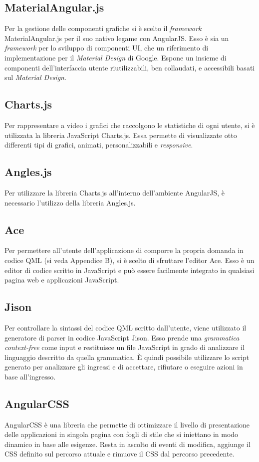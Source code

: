 \subsection{MaterialAngular.js}
Per la gestione delle componenti grafiche si è scelto il \textit{framework} MaterialAngular.js per il suo nativo legame con AngularJS. Esso è sia un \textit{framework} per lo sviluppo di componenti UI, che un riferimento di implementazione per il \textit{Material Design} di Google. Espone un insieme di componenti dell'interfaccia utente riutilizzabili, ben collaudati, e accessibili basati sul \textit{Material Design}.
\subsection{Charts.js}
Per rappresentare a video i grafici che raccolgono le statistiche di ogni utente, si è utilizzata la libreria JavaScript Charts.js. Essa permette di visualizzate otto differenti tipi di grafici, animati, personalizzabili e \textit{responsive}.
\subsection{Angles.js}
Per utilizzare la libreria Charts.js all'interno dell'ambiente AngularJS, è necessario l'utilizzo della libreria Angles.js.
\subsection{Ace}
Per permettere all'utente dell'applicazione \progetto{} di comporre la propria domanda in codice QML (si veda Appendice B), si è scelto di sfruttare l'editor Ace. Esso è un editor di codice scritto in JavaScript e può essere facilmente integrato in qualsiasi pagina web e applicazioni JavaScript.
\subsection{Jison}
Per controllare la sintassi del codice QML scritto dall'utente, viene utilizzato il generatore di parser in codice JavaScript Jison. Esso prende una \textit{grammatica context-free} come input e restituisce un file JavaScript in grado di analizzare il linguaggio descritto da quella grammatica. È quindi possibile utilizzare lo script generato per analizzare gli ingressi e di accettare, rifiutare o eseguire azioni in base all'ingresso.
\subsection{AngularCSS}
AngularCSS è una libreria che permette di ottimizzare il livello di presentazione delle applicazioni in singola pagina con fogli di stile che si iniettano in modo dinamico in base alle esigenze. Resta in ascolto di eventi di modifica, aggiunge il CSS definito sul percorso attuale e rimuove il CSS dal percorso precedente.
